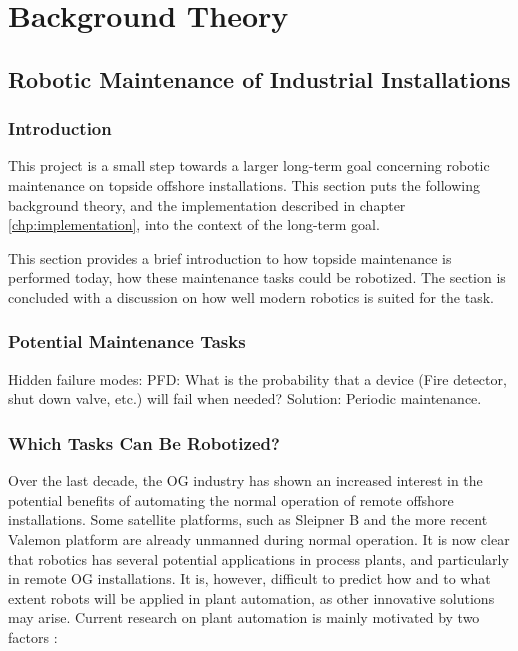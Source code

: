 \chapter{Background Theory}
\label{chp:theory} 


\section{Robotic Maintenance of Industrial Installations}

\subsection{Introduction}

This project is a small step towards a larger long-term goal concerning robotic maintenance on topside offshore installations. This section puts the following background theory, and the implementation described in chapter \ref{chp:implementation}, into the context of the long-term goal. 

This section provides a brief introduction to how topside maintenance is performed today, how these maintenance tasks could be robotized. The section is concluded with a discussion on how well modern robotics is suited for the task. 

\subsection{Potential Maintenance Tasks}

Hidden failure modes: PFD: What is the probability that a device (Fire detector, shut down valve, etc.) will fail when needed? 
Solution: Periodic maintenance.

\subsection{Which Tasks Can Be Robotized?}


Over the last decade, the \ac{OG} industry has shown an increased interest in the potential benefits of automating the normal operation of remote offshore installations. Some satellite platforms, such as Sleipner B and the more recent Valemon platform are already unmanned during normal operation. It is now clear that robotics has several potential applications in process plants, and particularly in remote \ac{OG} installations. It is, however, difficult to predict how and to what extent robots will be applied in plant automation, as other innovative solutions may arise\cite{statoil_ubemannet}\cite{subsea_konkurranse}\cite{E24}. Current research on plant automation is mainly motivated by two factors\cite{AutonomousOG} \cite{StepwiseApproachToRobotics}:

